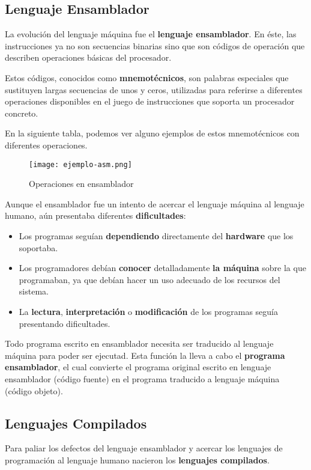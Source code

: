 \subsection{Lenguaje Ensamblador}
La evolución del lenguaje máquina fue el \textbf{lenguaje ensamblador}. En éste, las instrucciones ya no son secuencias binarias sino que son códigos de operación que describen operaciones básicas del procesador.

Estos códigos, conocidos como \textbf{mnemotécnicos}, son palabras especiales que sustituyen largas secuencias de unos y ceros, utilizadas para referirse a diferentes operaciones disponibles en el juego de instrucciones que soporta un procesador concreto.

En la siguiente tabla, podemos ver alguno ejemplos de estos mnemotécnicos con diferentes operaciones.

\begin{figure}[H]
    \centering
    \texttt{[image: ejemplo-asm.png]}
    \caption{Operaciones en ensamblador}
\end{figure}

Aunque el ensamblador fue un intento de acercar el lenguaje máquina al lenguaje humano, aún presentaba diferentes \textbf{dificultades}:
\begin{itemize}
    \item Los programas seguían \textbf{dependiendo} directamente del \textbf{hardware} que los soportaba.
    \item Los programadores debían \textbf{conocer} detalladamente \textbf{la máquina} sobre la que programaban, ya que debían hacer un uso adecuado de los recursos del sistema.
    \item La \textbf{lectura}, \textbf{interpretación} o \textbf{modificación} de los programas seguía presentando dificultades.
\end{itemize}

Todo programa escrito en ensamblador necesita ser traducido al lenguaje máquina para poder ser ejecutad. Esta función la lleva a cabo el \textbf{programa ensamblador}, el cual convierte el programa original escrito en lenguaje ensamblador (código fuente) en el programa traducido a lenguaje máquina (código objeto).

\subsection{Lenguajes Compilados}
Para paliar los defectos del lenguaje ensamblador y acercar los lenguajes de programación al lenguaje humano nacieron los \textbf{lenguajes compilados}.

